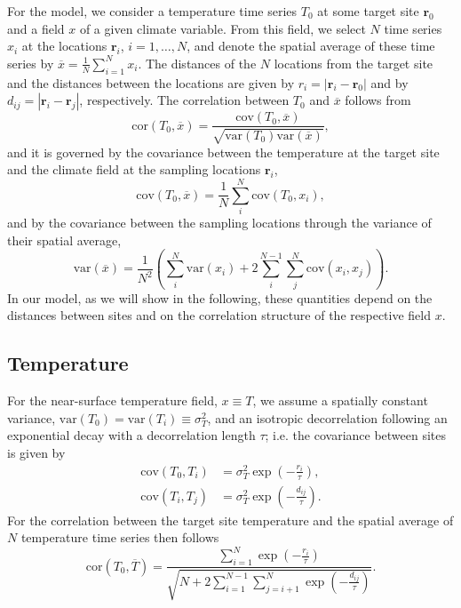 \documentclass[cp, manuscript]{copernicus}
\begin{document}
For the model, we consider a temperature time series $T_0$ at some target site
$\mathbf{r}_0$ and a field $x$ of a given climate variable. From this field, we
select $N$ time series $x_i$ at the locations $\mathbf{r}_i$, $i=1,\dotsc,N$,
and denote the spatial average of these time series by
$\overline{x}=\frac{1}{N}\sum_{i=1}^{N}{x_i}$. The distances of the $N$
locations from the target site and the distances between the locations are given
by $r_i=|\mathbf{r}_i-\mathbf{r}_0|$ and by
$d_{ij}=|{\mathbf{r}_i-\mathbf{r}_j}|$, respectively. The correlation between
$T_0$ and $\overline{x}$ follows from
%
\begin{equation}
\label{eq:corr.general}
\mathrm{cor}(T_0,\overline{x})=\frac
{\mathrm{cov}(T_0,\overline{x})}
{\sqrt{\mathrm{var}(T_0)\mathrm{var}(\overline{x})}},
\end{equation}
and it is governed by the covariance between the temperature at the target site
and the climate field at the sampling locations $\mathbf{r}_i$,
%
\begin{equation}
\label{eq:cov.general}
\mathrm{cov}(T_0,\overline{x})=
\frac{1}{N}\sum_{i}^{N}{\mathrm{cov}(T_0,x_i)},
\end{equation}
%
and by the covariance between the sampling locations through the variance of
their spatial average,
\begin{equation}
\label{eq:var.general}
\mathrm{var}(\overline{x})=
\frac{1}{N^2}\left(
\sum_{i}^{N}{\mathrm{var}(x_i)} +
2\sum_{i}^{N-1}\sum_{j}^{N}{\mathrm{cov}(x_i,x_j)}
\right).
\end{equation}
%
In our model, as we will show in the following, these quantities depend on the
distances between sites and on the correlation structure of the respective field
$x$.

\subsection{Temperature}
\label{app:concept.model.t2m}

For the near-surface temperature field, $x \equiv T$, we assume a spatially
constant variance, $\mathrm{var}(T_0)=\mathrm{var}(T_i)\equiv\sigma_T^2$, and an
isotropic decorrelation following an exponential decay with a decorrelation
length $\tau$; i.e. the covariance between sites is given by
%
\begin{align}
\label{eq:t2m.decorr}
\mathrm{cov}(T_0,T_i)&=\sigma_T^2\exp{\left(-\frac{r_i}{\tau}\right)},\\
\mathrm{cov}(T_i,T_j)&=\sigma_T^2\exp{\left(-\frac{d_{ij}}{\tau}\right)}.
\end{align}
%
For the correlation between the target site temperature and the spatial average
of $N$ temperature time series then follows
%
\begin{equation}
\label{eq:t2m.corr}
\mathrm{cor}(T_0,\overline{T})=
\frac{\sum_{i=1}^{N}\exp{\left(-\frac{r_i}{\tau}\right)}}
{\sqrt{N+2\sum_{i=1}^{N-1}
\sum_{j=i+1}^{N}{\exp{\left(-\frac{d_{ij}}{\tau}\right)}}}}.
\end{equation}
\end{document}
